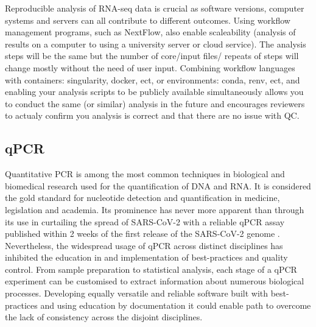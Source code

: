 \documentclass{SBCbookchapter}
\begin{document}
Reproducible analysis of RNA-seq data is crucial as software versions, computer systems and servers can all contribute to different outcomes. Using workflow management programs, such as NextFlow, also enable scaleability (analysis of results on a computer to using a university server or cloud service). The analysis steps will be the same but the number of core/input files/ repeats of steps will change mostly without the need of user input. Combining workflow languages with containers: singularity, docker, ect, or environments: conda, renv, ect, and enabling your analysis scripts to be publicly available simultaneously allows you to conduct the same (or similar) analysis in the future and encourages reviewers to actualy confirm you analysis is correct and that there are no issue with QC.

\subsection{qPCR}

Quantitative PCR is among the most common techniques in biological and biomedical research used for the quantification of DNA and RNA. It is considered the gold standard for nucleotide detection and quantification in medicine, legislation and academia. Its prominence has never more apparent than through its use in curtailing the spread of SARS-CoV-2 with a reliable qPCR assay published within 2 weeks of the first release of the SARS-CoV-2 genome \cite{Li2020}. Nevertheless, the widespread usage of qPCR across distinct disciplines has inhibited the education in and implementation of best-practices and quality control. \cite{Bustin2021} From sample preparation to statistical analysis, each stage of a qPCR experiment can be customised to extract information about numerous biological processes. Developing equally versatile and reliable software built with best-practices and using education by documentation it could enable path to overcome the lack of consistency across the disjoint disciplines. 
\end{document}
